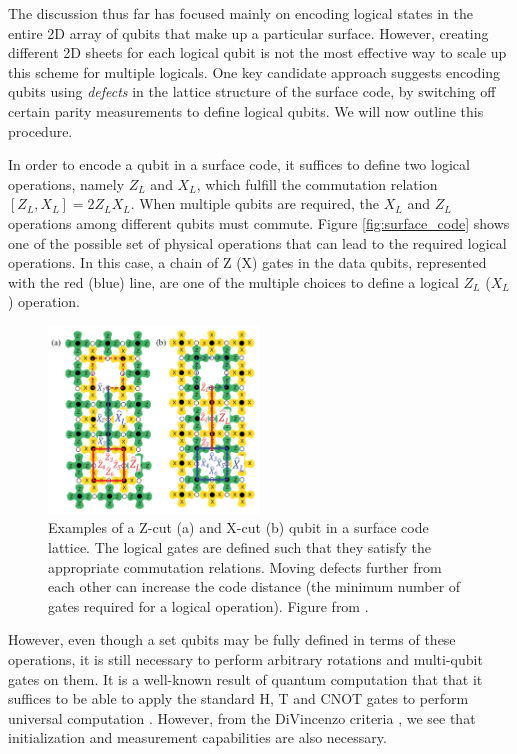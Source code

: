 The discussion thus far has focused mainly on encoding logical states in the
entire 2D array of qubits that make up a particular surface. However, creating
different 2D sheets for each logical qubit is not the most effective way to
scale up this scheme for multiple logicals. One key candidate approach suggests
encoding qubits using \textit{defects} in the lattice structure of the surface
code, by switching off certain parity measurements to define logical qubits. We
will now outline this procedure.

In order to encode a qubit in a surface code, it suffices to define two logical
operations, namely $Z_L$ and $X_L$, which fulfill the commutation relation
$[Z_L,X_L] = 2Z_LX_L$. When multiple qubits are required, the $X_L$ and $Z_L$
operations among different qubits must commute. Figure \ref{fig:surface_code}
shows one of the possible set of physical operations that can lead to the
required logical operations. In this case, a chain of Z (X) gates in the data
qubits, represented with the red (blue) line, are one of the multiple choices to
define a logical $Z_L$ ($X_L$) operation.

\begin{figure}[htbp]
  \centering
  \includegraphics[width=0.5\textwidth]{images/surface_code_cuts.pdf}
  \caption{Examples of a Z-cut (a) and X-cut (b) qubit in a surface code
    lattice. The logical gates are defined such that they satisfy the
    appropriate commutation relations. Moving defects further from each other
    can increase the code distance (the minimum number of gates required for a
    logical operation). Figure from \cite{fowler12_surfac_codes}.}
  \label{fig:cuts}
\end{figure}

However, even though a set qubits may be fully defined in terms of these
operations, it is still necessary to perform arbitrary rotations and multi-qubit
gates on them. It is a well-known result of quantum computation that that it
suffices to be able to apply the standard H, T and CNOT gates to perform
universal computation \cite{nielsen_chuang_2010}. However, from the DiVincenzo
criteria \cite{DiCincenzoCriteria}, we see that initialization and
measurement capabilities are also necessary.


